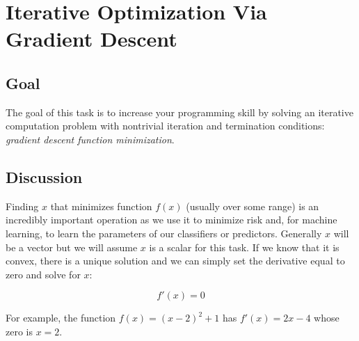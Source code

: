 \chapter{Iterative Optimization Via Gradient Descent}

\section{Goal}

\begin{fullwidth}

The goal of this task is to increase your programming skill by solving an iterative computation problem with nontrivial iteration and termination conditions: {\em gradient descent function minimization}.

\section{Discussion}

Finding $x$ that minimizes function $f(x)$ (usually over some range) is an incredibly important operation as we use it to minimize risk and, for machine learning, to learn the parameters of our classifiers or predictors. Generally $x$ will be a vector but we will assume $x$ is a scalar for this task. If we know that it is convex, there is a unique solution and we can simply set the derivative equal to zero and solve for $x$:

\[\tag{Analytic solution to convex optimization}
f'(x) = 0
\]

\noindent For example, the function $f(x) = (x-2)^2 + 1$ has $f'(x) = 2x - 4$ whose zero is $x=2$.



\end{fullwidth}

